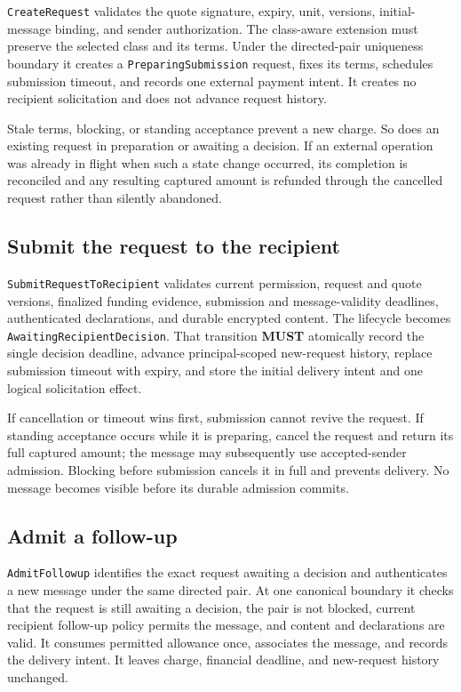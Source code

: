 \documentclass[11pt]{article}
\newcommand{\MUST}{\textbf{MUST}}
\begin{document}
\texttt{CreateRequest} validates the quote signature, expiry, unit, versions,
initial-message binding, and sender authorization. The class-aware extension must
preserve the selected class and its terms. Under the directed-pair
uniqueness boundary it creates a \texttt{PreparingSubmission} request, fixes its terms,
schedules submission timeout, and records one external payment intent. It creates
no recipient solicitation and does not advance request history.

Stale terms, blocking, or standing acceptance prevent a new charge. So does an
existing request in preparation or awaiting a decision. If an external operation was already in flight when such a state
change occurred, its completion is reconciled and any resulting captured amount
is refunded through the cancelled request rather than silently abandoned.

\subsection{Submit the request to the recipient}

\texttt{SubmitRequestToRecipient} validates current permission, request and quote versions,
finalized funding evidence, submission and message-validity deadlines,
authenticated declarations, and durable encrypted content. The lifecycle becomes
\texttt{AwaitingRecipientDecision}. That transition \MUST{} atomically record the
single decision deadline, advance principal-scoped new-request history, replace
submission timeout with expiry, and store the initial delivery intent and one
logical solicitation effect.

If cancellation or timeout wins first, submission cannot revive the request. If
standing acceptance occurs while it is preparing, cancel the request and return its full
captured amount; the message may subsequently use accepted-sender admission.
Blocking before submission cancels it in full and prevents delivery. No message
becomes visible before its durable admission commits.

\subsection{Admit a follow-up}

\texttt{AdmitFollowup} identifies the exact request awaiting a decision and authenticates a new
message under the same directed pair. At one canonical boundary it checks that
the request is still awaiting a decision, the pair is not blocked, current recipient
follow-up policy permits the message, and content and declarations are valid.
It consumes permitted allowance once, associates the message, and records the
delivery intent. It leaves charge, financial deadline, and new-request history
unchanged.
\end{document}
